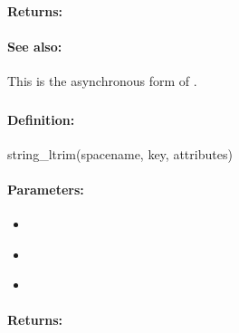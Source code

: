 \paragraph{Returns:}


\paragraph{See also:}  This is the asynchronous form of .

\pagebreak
\subsubsection{}
\label{api:ruby:string_ltrim}


\paragraph{Definition:}
\begin{rubycode}
string_ltrim(spacename, key, attributes)
\end{rubycode}

\paragraph{Parameters:}
\begin{itemize}[noitemsep]
\item {}\\

\item {}\\

\item {}\\

\end{itemize}

\paragraph{Returns:}


\pagebreak
\subsubsection{}
\label{api:ruby:async_string_ltrim}


